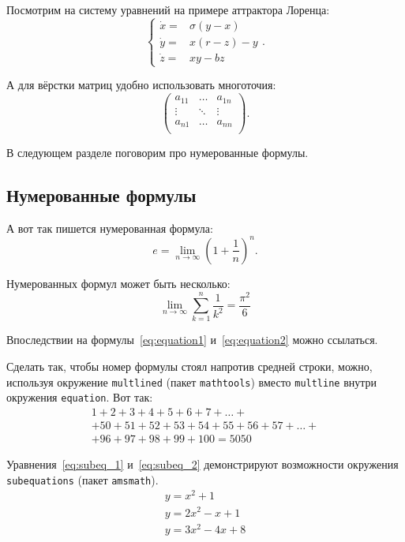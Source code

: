 \documentclass[12pt]{extarticle}
\begin{document}
Посмотрим на систему уравнений на примере аттрактора Лоренца:
\[\left\{
\begin{array}{rl}
    \dot x = & \sigma (y-x)  \\
    \dot y = & x (r - z) - y \\
    \dot z = & xy - bz
\end{array}\right..\]

А для вёрстки матриц удобно использовать многоточия:
\[\left(\begin{array}{ccc}
a_{11} & \ldots & a_{1n} \\
\vdots & \ddots & \vdots \\
a_{n1} & \ldots & a_{nn} \\
\end{array} \right).\]

В следующем разделе поговорим про нумерованные формулы.
\subsection{Нумерованные формулы}
\label{subsec:ch1/sec3/sub3}
А вот так пишется нумерованная формула:
\begin{equation}
\label{eq:equation1}
 e = \lim_{n \to \infty} \left( 1+\frac{1}{n} \right)^n.
\end{equation}

Нумерованных формул может быть несколько:
\begin{equation}
\label{eq:equation2}
\lim_{n \to \infty} \sum_{k=1}^n \frac{1}{k^2} = \frac{\pi^2}{6}
\end{equation}

Впоследствии на формулы~\eqref{eq:equation1} и~\eqref{eq:equation2} можно ссылаться.

Сделать так, чтобы номер формулы стоял напротив средней строки, можно, используя окружение \texttt{multlined} (пакет \texttt{mathtools}) вместо \texttt{multline} внутри окружения \texttt{equation}. Вот так:
\begin{equation}
\label{eq:equation3}
\begin{multlined}
        1+ 2+3+4+5+6+7+\dots + \\
        + 50+51+52+53+54+55+56+57 + \dots + \\
        + 96+97+98+99+100=5050
\end{multlined}
\end{equation}

Уравнения~\eqref{eq:subeq_1} и~\eqref{eq:subeq_2} демонстрируют возможности окружения \texttt{subequations} (пакет \texttt{amsmath}).
\begin{subequations}
\label{eq:subeq_1}
\begin{gather}
        y = x^2 + 1\label{eq:subeq_1-1} \\
        y = 2 x^2 - x + 1\label{eq:subeq_1-2} \\
        y = 3 x^2 - 4x + 8\label{eq:subeq_1-3}
    \end{gather}
\end{subequations}
\end{document}
